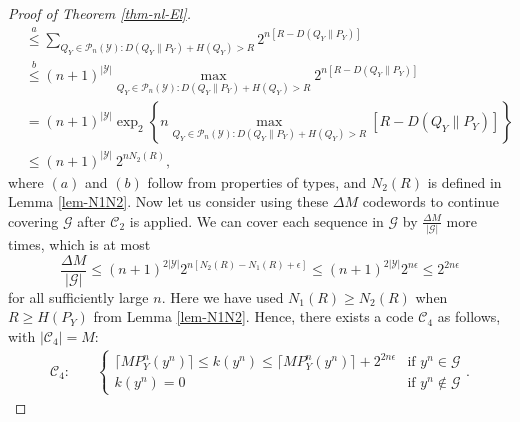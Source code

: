 \documentclass[10pt,a4paper]{amsart}
\newcommand{\carY}{|\mY|}
\newcommand{\mC}{\mathcal{C}}
\newcommand{\mG}{\mathcal{G}}
\newcommand{\mP}{\mathcal{P}}
\newcommand{\mY}{\mathcal{Y}}
\begin{document}
\begin{proof}[Proof of Theorem \ref{thm-nl-El}]
\begin{align*}
    &\overset{a}{\leq} \sum_{Q_Y\in\mP_n(\mY): D(Q_Y\|P_Y) + H(Q_Y)>R} 2^{n\left[R-D(Q_Y\|P_Y)\right]} \\
    &\overset{b}{\leq} (n+1)^{\carY} \max_{Q_Y\in\mP_n(\mY): D(Q_Y\|P_Y) + H(Q_Y)>R} 2^{n\left[R-D(Q_Y\|P_Y)\right]} \\
    &= (n+1)^{\carY} \exp_2 \left\{ n \max_{Q_Y\in\mP_n(\mY): D(Q_Y\|P_Y) + H(Q_Y)>R} \left[R-D(Q_Y\|P_Y)\right] \right\} \\
    &\leq (n+1)^{\carY} \ 2^{n N_2(R)},
\end{align*}
where $(a)$ and $(b)$ follow from properties of types, and $N_2(R)$ is defined in Lemma \ref{lem-N1N2}. 
Now let us consider using these $\Delta M$ codewords to continue covering $\mG$ after $\mC_2$ is applied. We can cover each sequence in $\mG$ by $\frac{\Delta M}{|\mG|}$ more times, which is at most
$$ \frac{\Delta M}{|\mG|} \leq (n+1)^{2\carY} 2^{n \left[N_2(R)-N_1(R) + \epsilon\right]} \leq (n+1)^{2\carY} 2^{n\epsilon} \leq 2^{2n\epsilon} $$
for all sufficiently large $n$. Here we have used $N_1(R)\geq N_2(R)$ when $R\geq H(P_Y)$ from Lemma \ref{lem-N1N2}. Hence, there exists a code $\mC_4$ as follows, with $|\mC_4| = M$:
\begin{align*}
    \mC_4: \quad 
    &
    \begin{cases}
        \lceil MP_Y^n(y^n) \rceil \leq k(y^n) \leq \lceil MP_Y^n(y^n) \rceil + 2^{2n\epsilon} & \text{if } y^n\in\mG \\
        k(y^n) = 0 & \text{if } y^n\notin\mG
    \end{cases}.
\end{align*}


\end{proof}
\end{document}
